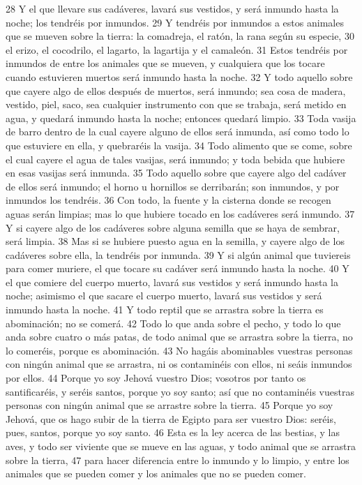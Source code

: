 28 Y el que llevare sus cadáveres, lavará sus vestidos, y será inmundo hasta la noche; los tendréis por inmundos.
29 Y tendréis por inmundos a estos animales que se mueven sobre la tierra: la comadreja, el ratón, la rana según su especie,
30 el erizo, el cocodrilo, el lagarto, la lagartija y el camaleón.
31 Estos tendréis por inmundos de entre los animales que se mueven, y cualquiera que los tocare cuando estuvieren muertos será inmundo hasta la noche.
32 Y todo aquello sobre que cayere algo de ellos después de muertos, será inmundo; sea cosa de madera, vestido, piel, saco, sea cualquier instrumento con que se trabaja, será metido en agua, y quedará inmundo hasta la noche; entonces quedará limpio.
33 Toda vasija de barro dentro de la cual cayere alguno de ellos será inmunda, así como todo lo que estuviere en ella, y quebraréis la vasija.
34 Todo alimento que se come, sobre el cual cayere el agua de tales vasijas, será inmundo; y toda bebida que hubiere en esas vasijas será inmunda.
35 Todo aquello sobre que cayere algo del cadáver de ellos será inmundo; el horno u hornillos se derribarán; son inmundos, y por inmundos los tendréis.
36 Con todo, la fuente y la cisterna donde se recogen aguas serán limpias; mas lo que hubiere tocado en los cadáveres será inmundo.
37 Y si cayere algo de los cadáveres sobre alguna semilla que se haya de sembrar, será limpia.
38 Mas si se hubiere puesto agua en la semilla, y cayere algo de los cadáveres sobre ella, la tendréis por inmunda.
39 Y si algún animal que tuviereis para comer muriere, el que tocare su cadáver será inmundo hasta la noche.
40 Y el que comiere del cuerpo muerto, lavará sus vestidos y será inmundo hasta la noche; asimismo el que sacare el cuerpo muerto, lavará sus vestidos y será inmundo hasta la noche.
41 Y todo reptil que se arrastra sobre la tierra es abominación; no se comerá.
42 Todo lo que anda sobre el pecho, y todo lo que anda sobre cuatro o más patas, de todo animal que se arrastra sobre la tierra, no lo comeréis, porque es abominación.
43 No hagáis abominables vuestras personas con ningún animal que se arrastra, ni os contaminéis con ellos, ni seáis inmundos por ellos.
44 Porque yo soy Jehová vuestro Dios; vosotros por tanto os santificaréis, y seréis santos, porque yo soy santo; así que no contaminéis vuestras personas con ningún animal que se arrastre sobre la tierra.
45 Porque yo soy Jehová, que os hago subir de la tierra de Egipto para ser vuestro Dios: seréis, pues, santos, porque yo soy santo.
46 Esta es la ley acerca de las bestias, y las aves, y todo ser viviente que se mueve en las aguas, y todo animal que se arrastra sobre la tierra,
47 para hacer diferencia entre lo inmundo y lo limpio, y entre los animales que se pueden comer y los animales que no se pueden comer.

